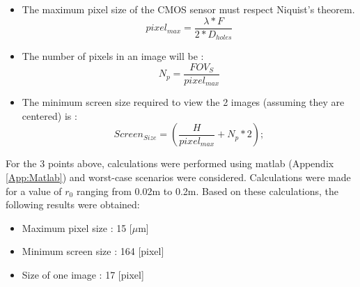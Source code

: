 \begin{itemize}
    \item The maximum pixel size of the CMOS sensor must respect Niquist's theorem.
          \begin{equation}
              pixel_{max} = \frac{\lambda*F}{2*D_{holes}}
          \end{equation}
    \item The number of pixels in an image will be :
          \begin{equation}
              N_{p} = \frac{FOV_S}{pixel_{max}}
          \end{equation}
    \item The minimum screen size required to view the 2 images (assuming they are centered) is :
          \begin{equation}
              Screen_{Size} = (\frac{H}{pixel_{max}}+ N_{p}*2);
          \end{equation}
\end{itemize}
For the 3 points above, calculations were performed using matlab (Appendix \ref{App:Matlab}) and worst-case scenarios
were considered. Calculations were made for a value of $r_0$ ranging from 0.02m to 0.2m.
Based on these calculations, the following results were obtained:
\begin{itemize}
    \item Maximum pixel size : 15 [$\mu$m]
    \item Minimum screen size : 164 [pixel]
    \item Size of one image : 17 [pixel]
\end{itemize}
